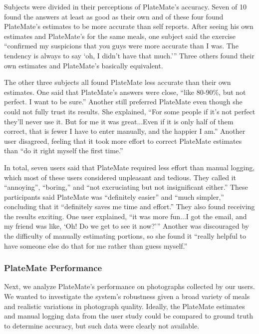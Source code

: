Subjects were divided in their perceptions of PlateMate's
accuracy. Seven of 10 found the answers at least as good as their
own and of these four found PlateMate's estimates to be more accurate than self
reports.  After seeing his
own estimates and PlateMate's for the same meals, one subject said the
exercise ``confirmed my suspicions that you guys were more accurate
than I was. The tendency is always to say `oh, I didn't have that
much.''' Three others found their own estimates and PlateMate's
basically equivalent.

The other three subjects all found PlateMate less accurate than their
own estimates. One said that PlateMate's answers were close, ``like
$80$-$90\%$, but not perfect. I want to be sure.'' Another still
preferred PlateMate even though she could not fully trust its
results. She explained, ``For some people if it's not perfect they'll
never use it. But for me it was great...Even if it is only half of
them correct, that is fewer I have to enter manually, and the happier
I am.'' Another user disagreed, feeling that it took more effort to
correct PlateMate estimates than ``do it right myself the first
time.''

In total, seven users said that PlateMate required less effort than
manual logging, which most of these users considered unpleasant and
tedious. They called it ``annoying'', ``boring,'' and ``not
excruciating but not insignificant either.'' These participants said
PlateMate was ``definitely easier'' and ``much simpler,'' concluding
that it ``definitely saves me time and effort.'' They also found
receiving the results exciting. One user explained, ``it was more
fun...I got the email, and my friend was like, `Oh! Do we get to see
it now?''' Another was discouraged by the difficulty of manually
estimating portions, so she found it ``really helpful to have someone
else do that for me rather than guess myself.''

\subsubsection {PlateMate Performance}

Next, we analyze PlateMate's performance on photographs collected by
our users.  We wanted to investigate the system's robustness given a
broad variety of meals and realistic variations in photograph quality.
Ideally, the PlateMate estimates and manual logging data from the user
study could be compared to ground truth to determine accuracy, but
such data were clearly not available.

